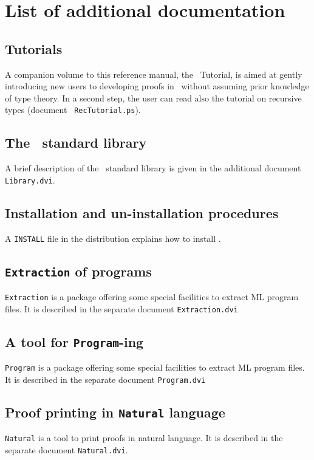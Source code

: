\chapter[List of additional documentation]{List of additional documentation\label{Addoc}}

\section[Tutorials]{Tutorials\label{Tutorial}}
A companion volume to this reference manual, the \Coq\ Tutorial, is
aimed at gently introducing new users to developing proofs in \Coq\
without assuming prior knowledge of type theory. In a second step, the
user can read also the tutorial on recursive types (document {\tt
RecTutorial.ps}).

\section[The \Coq\ standard library]{The \Coq\ standard library\label{Addoc-library}}
A brief description of the \Coq\ standard library is given in the additional
document {\tt Library.dvi}.

\section[Installation and un-installation procedures]{Installation and un-installation procedures\label{Addoc-install}}
A \verb!INSTALL! file in the distribution explains how to install
\Coq.

\section[{\tt Extraction} of programs]{{\tt Extraction} of programs\label{Addoc-extract}}
{\tt Extraction} is a package offering some special facilities to
extract ML program files. It is described in the separate document
{\tt Extraction.dvi}

\section[{\tt Program}]{A tool for {\tt Program}-ing\label{Addoc-program}}
{\tt Program} is a package offering some special facilities to
extract ML program files. It is described in the separate document
{\tt Program.dvi}

\section[Proof printing in {\tt Natural} language]{Proof printing in {\tt Natural} language\label{Addoc-natural}}
{\tt Natural} is a tool to print proofs in natural language.
It is described in the separate document {\tt Natural.dvi}.

